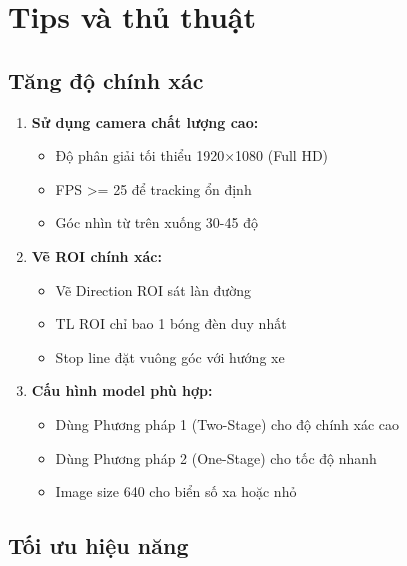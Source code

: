 \section{Tips và thủ thuật}

\subsection{Tăng độ chính xác}

\begin{enumerate}
    \item \textbf{Sử dụng camera chất lượng cao:}
    \begin{itemize}
        \item Độ phân giải tối thiểu 1920×1080 (Full HD)
        \item FPS >= 25 để tracking ổn định
        \item Góc nhìn từ trên xuống 30-45 độ
    \end{itemize}

    \item \textbf{Vẽ ROI chính xác:}
    \begin{itemize}
        \item Vẽ Direction ROI sát làn đường
        \item TL ROI chỉ bao 1 bóng đèn duy nhất
        \item Stop line đặt vuông góc với hướng xe
    \end{itemize}

    \item \textbf{Cấu hình model phù hợp:}
    \begin{itemize}
        \item Dùng Phương pháp 1 (Two-Stage) cho độ chính xác cao
        \item Dùng Phương pháp 2 (One-Stage) cho tốc độ nhanh
        \item Image size 640 cho biển số xa hoặc nhỏ
    \end{itemize}
\end{enumerate}

\subsection{Tối ưu hiệu năng}

